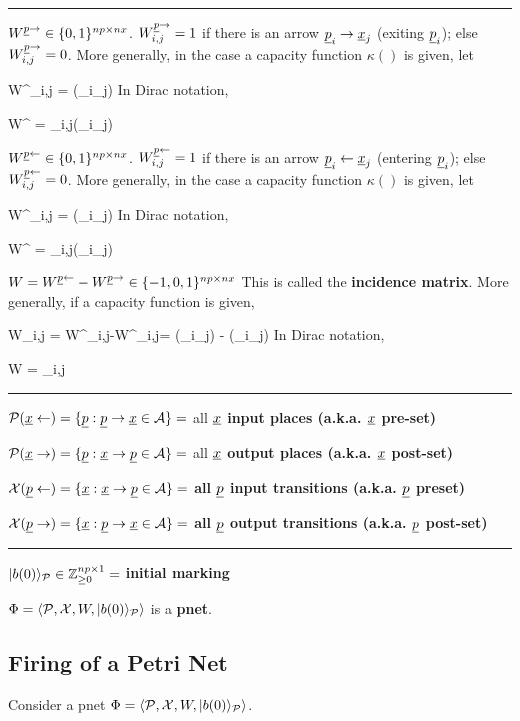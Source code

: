 \hrule
$W^{\rvp\rarrow} \in \bool^{np\times nx}$. 
$W^{\rvp\rarrow}_{i,j} = 1$ if there is an arrow $\rvp_i\rarrow\rvx_j$
(exiting $\rvp_i$);
else $W^{\rvp\rarrow}_{i,j} = 0$. More generally, in the case a capacity function $\kappa()$ is given, let

\beq
W^{\rvp\rarrow}_{i,j} = \kappa(\rvp_i\rarrow \rvx_j)
\eeq
In Dirac notation, 

\beq
W^{\rvp\rarrow} = \sum_{i,j}\kappa(\rvp_i\rarrow \rvx_j)
\eeq


$W^{\rvp\larrow} \in \bool^{np\times nx}$. 
$W^{\rvp\larrow}_{i,j} = 1$ if there is an arrow $\rvp_i\larrow\rvx_j$
(entering $\rvp_i$);
else $W^{\rvp\larrow}_{i,j} = 0$. More generally, in the case a capacity function $\kappa()$ is given, let

\beq
W^{\rvp\larrow}_{i,j} = \kappa(\rvp_i\larrow \rvx_j)
\eeq
In Dirac notation, 

\beq
W^{\rvp\larrow} = \sum_{i,j}\kappa(\rvp_i\larrow \rvx_j)
\eeq

$W =W^{\rvp\larrow}-W^{\rvp\rarrow}\in \{-1, 0, 1\}^{np\times nx}$ This is called the {\bf incidence matrix}.
More generally, if a capacity function is given, 

\beq
W_{i,j} =
 W^{\rvp\larrow}_{i,j}-W^{\rvp\rarrow}_{i,j}=
\kappa(\rvp_i\larrow \rvx_j)
-
\kappa(\rvp_i\rarrow \rvx_j)
\eeq
In Dirac notation, 

\beq
W =  \sum_{i,j}
\eeq

\hrule
$\calp(\rvx\larrow) = \{\rvp : \rvp \rarrow \rvx\in\cala\}=$ all {\bf $\rvx$ input places (a.k.a. $\rvx$ pre-set)}

$\calp(\rvx\rarrow) = \{\rvp : \rvx \rarrow \rvp \in \cala\}=$ all {\bf $\rvx$ output places (a.k.a. $\rvx$ post-set)}

$\calx(\rvp\larrow) = \{\rvx : \rvx \rarrow \rvp \in \cala \}=$ {\bf all $\rvp$ input transitions (a.k.a. $\rvp$ preset)}

$\calx(\rvp\rarrow) = \{\rvx : \rvp \rarrow\rvx \in\cala\}=$ {\bf all $\rvp$ output transitions (a.k.a. $\rvp$ post-set)}

\hrule
$|b(0)\rangle_{\cal P}\in {\mathbb{Z}}_{\geq 0}^{np\times 1} =$ {\bf initial marking}

$\Phi = \left\langle{\cal P}, {\cal X}, W,|b(0)\rangle_{\cal P}\right\rangle$ is a {\bf pnet}.
\subsection{Firing of a Petri Net}
Consider a pnet $\Phi = \left\langle{\cal P}, {\cal X}, W,|b(0)\rangle_{\cal P}\right\rangle$.


